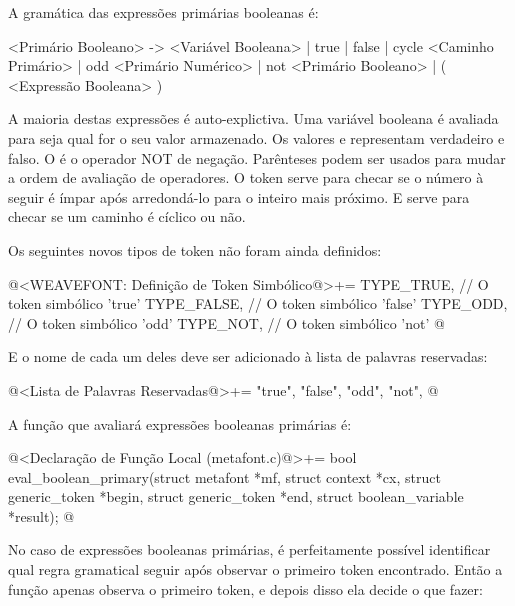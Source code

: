 {{{{{{A gramática das expressões primárias booleanas é:

\alinhaverbatim
<Primário Booleano> -> <Variável Booleana> | true | false |
                       cycle <Caminho Primário> | odd <Primário Numérico> |
                       not <Primário Booleano> |
                       ( <Expressão Booleana> )
\alinhanormal

A maioria destas expressões é auto-explictiva. Uma variável booleana é
avaliada para seja qual for o seu valor armazenado. Os
valores  e  representam verdadeiro
e falso. O  é o operador NOT de negação. Parênteses
podem ser usados para mudar a ordem de avaliação de operadores. O
token  serve para checar se o número à seguir é ímpar
após arredondá-lo para o inteiro mais próximo. E 
serve para checar se um caminho é cíclico ou não.

Os seguintes novos tipos de token não foram ainda definidos:

\iniciocodigo
@<WEAVEFONT: Definição de Token Simbólico@>+=
TYPE_TRUE,                    // O token simbólico 'true'
TYPE_FALSE,                   // O token simbólico 'false'
TYPE_ODD,                     // O token simbólico 'odd'
TYPE_NOT,                     // O token simbólico 'not'
@
\fimcodigo

E o nome de cada um deles deve ser adicionado à lista de palavras
reservadas:

\iniciocodigo
@<Lista de Palavras Reservadas@>+=
"true", "false", "odd", "not",
@
\fimcodigo

A função que avaliará expressões booleanas primárias é:

\iniciocodigo
@<Declaração de Função Local (metafont.c)@>+=
bool eval_boolean_primary(struct metafont *mf, struct context *cx,
                          struct generic_token *begin,
                          struct generic_token *end,
                          struct boolean_variable *result);
@
\fimcodigo

No caso de expressões booleanas primárias, é perfeitamente possível
identificar qual regra gramatical seguir após observar o primeiro
token encontrado. Então a função apenas observa o primeiro token, e
depois disso ela decide o que fazer:

}}}}}}
